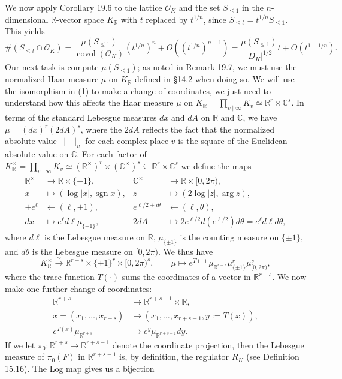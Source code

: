\documentclass[UTF8,11pt]{ctexart}
\theoremstyle{definition}
\newcommand{\R}{\mathbb R}
\newcommand{\C}{\mathbb C}
\begin{document}
We now apply Corollary 19.6 to the lattice $\mathcal O_K$ and the set $S_{\leq1}$ in the $n$-dimensional $\R$-vector space $K_\R$ with $t$ replaced by $t^{1/n}$, since $S_{\leq t}=t^{1/n}S_{\leq1}$. This yields
\[
\#(S_{\leq t}\cap\mathcal O_K)=\frac{\mu(S_{\leq1})}{\operatorname{covol}(\mathcal O_K)}(t^{1/n})^n+O((t^{1/n})^{n-1})
=\frac{\mu(S_{\leq1})}{|D_K|^{1/2}}t+O(t^{1-1/n}).\tag{2}
\]
Our next task is compute $\mu(S_{\leq1})$; as noted in Remark 19.7, we must use the normalized Haar measure $\mu$ on $K_\R$ defined in \S14.2 when doing so. We will use the isomorphism in (1) to make a change of coordinates, we just need to understand how this affects the Haar measure $\mu$ on $K_\R=\prod_{v\mid\infty}K_v\simeq\R^r\times\C^s$. In terms of the standard Lebesgue measures $dx$ and $dA$ on $\R$ and $\C$, we have $\mu=(dx)^r(2dA)^s$, where the $2dA$ reflects the fact that the normalized absolute value $\|\ \|_v$ for each complex place $v$ is the square of the Euclidean absolute value on $\C$. For each factor of $K_\R^\times=\prod_{v\mid\infty}K_v\simeq(\R^\times)^r\times(\C^\times)^s\subseteq\R^r\times\C^s$ we define the maps
\begin{align*}
\R^\times&\longrightarrow\R\times\{\pm1\},&\C^\times&\longrightarrow\R\times[0,2\pi),\\
x&\longmapsto(\log|x|,\operatorname{sgn}x),&z&\longmapsto(2\log|z|,\arg z),\\
\pm e^\ell&\longleftarrow(\ell,\pm1),&e^{\ell/2+i\theta}&\longleftarrow(\ell,\theta),\\
dx&\longmapsto e^\ell d\ell\mu_{\{\pm1\}},&2dA&\longmapsto2e^{\ell/2}d(e^{\ell/2})d\theta=e^\ell d\ell d\theta,
\end{align*}
where $d\ell$ is the Lebesgue measure on $\R$, $\mu_{\{\pm1\}}$ is the counting measure on $\{\pm1\}$, and $d\theta$ is the Lebesgue measure on $[0,2\pi)$. We thus have
\[
K_\R^\times\xrightarrow{\sim}\R^{r+s}\times\{\pm1\}^r\times[0,2\pi)^s,\qquad
\mu\mapsto e^{T(\cdot)}\mu_{\R^{r+s}}\mu_{\{\pm1\}}^r\mu_{[0,2\pi)}^s,
\]
where the trace function $T(\cdot)$ sums the coordinates of a vector in $\R^{r+s}$. We now make one further change of coordinates:
\begin{align*}
\R^{r+s}&\longrightarrow\R^{r+s-1}\times\R,\\
x=(x_1,\ldots,x_{r+s})&\longmapsto(x_1,\ldots,x_{r+s-1},y:=T(x)),\\
e^{T(x)}\mu_{\R^{r+s}}&\longmapsto e^y\mu_{\R^{r+s-1}}dy.
\end{align*}
If we let $\pi_0:\R^{r+s}\to\R^{r+s-1}$ denote the coordinate projection, then the Lebesgue measure of $\pi_0(F)$ in $\R^{r+s-1}$ is, by definition, the regulator $R_K$ (see Definition 15.16). The Log map gives us a bijection
\end{document}
